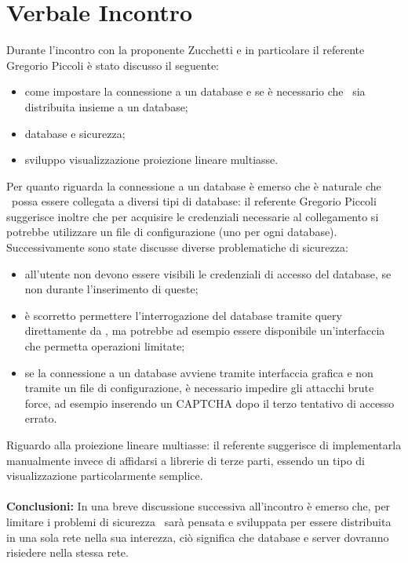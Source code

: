 \section{Verbale Incontro}
Durante l'incontro con la proponente Zucchetti e in particolare il referente Gregorio Piccoli è stato discusso il seguente:
\begin{itemize}
    \item come impostare la connessione a un database e se è necessario che \hd\ sia distribuita insieme a un database;
    \item database e sicurezza;
    \item sviluppo visualizzazione proiezione lineare multiasse.
\end{itemize}
Per quanto riguarda la connessione a un database è emerso che è naturale che \hd\ possa essere collegata a diversi tipi di database: il referente Gregorio Piccoli suggerisce inoltre che per acquisire le credenziali necessarie al collegamento si potrebbe utilizzare un file di configurazione (uno per ogni database).
Successivamente sono state discusse diverse problematiche di sicurezza: 
\begin{itemize}
    \item all'utente non devono essere visibili le credenziali di accesso del database, se non durante l'inserimento di queste;
    \item è scorretto permettere l'interrogazione del database tramite query direttamente da \hd , ma potrebbe ad esempio essere disponibile un'interfaccia che permetta operazioni limitate;
    \item se la connessione a un database avviene tramite interfaccia grafica e non tramite un file di configurazione, è necessario impedire gli attacchi brute force, ad esempio inserendo un CAPTCHA dopo il terzo tentativo di accesso errato.
\end{itemize}
Riguardo alla proiezione lineare multiasse: il referente suggerisce di implementarla manualmente invece di affidarsi a librerie di terze parti, essendo un tipo di visualizzazione particolarmente semplice.
\\ \\ \noindent
\textbf{Conclusioni:}
In una breve discussione successiva all'incontro è emerso che, per limitare i problemi di sicurezza \hd\ sarà pensata e sviluppata per essere distribuita in una sola rete nella sua interezza, ciò significa che database e server dovranno risiedere nella stessa rete.